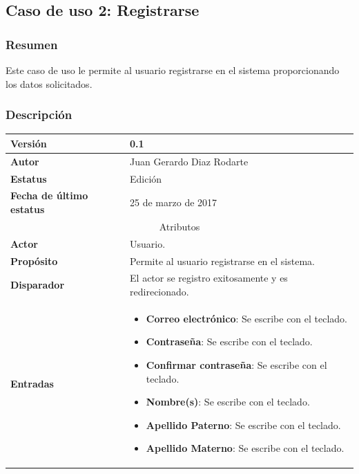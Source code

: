 \subsection{Caso de uso 2: Registrarse} \label{cu2}
\subsubsection{Resumen}
Este caso de uso le permite al usuario registrarse en el sistema proporcionando los datos solicitados.
\subsubsection{Descripción}
\begingroup
\setlength{\LTleft}{-10cm plus -1fill}
\setlength{\LTright}{\LTleft}
\begin{center}
  \addtocounter{table}{-1}
   \label{tab:cu2_tab}
  \begin{longtable}{| p{3.5cm} | p{11.5cm} |}
      	\hline
      		\textbf{Versión} &  0.1 \\
        \hline 
       		\textbf{Autor} & Juan Gerardo Diaz Rodarte\\
        \hline
          \textbf{Estatus} & Edición \\
        \hline  
          \textbf{Fecha de último estatus} & 25 de marzo de 2017 \\
        \hline
      \multicolumn{2}{|c|}{\large{Atributos}} \\
        \hline
          \textbf{Actor} & Usuario. \\
        \hline	
          \textbf{Propósito} & Permite al usuario registrarse en el sistema. \\
        \hline
          \textbf{Disparador} & El actor se registro exitosamente y es redirecionado. \\
        \hline
          \textbf{Entradas} & 
            \begin{itemize}
              \item \textbf{Correo electrónico}: Se escribe con el teclado.
              \item \textbf{Contraseña}: Se escribe con el teclado.
              \item \textbf{Confirmar contraseña}: Se escribe con el teclado.
              \item \textbf{Nombre(s)}: Se escribe con el teclado.
              \item \textbf{Apellido Paterno}: Se escribe con el teclado.
              \item \textbf{Apellido Materno}: Se escribe con el teclado.

\end{itemize}
\end{longtable}
\end{center}
